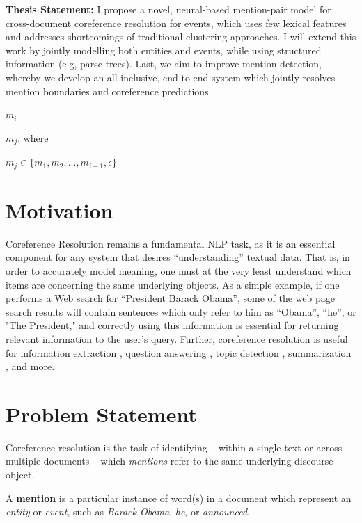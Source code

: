 \textbf{Thesis Statement:} I propose a novel, neural-based mention-pair model for cross-document coreference resolution for events, which uses few lexical features and addresses shortcomings of traditional clustering approaches.  I will extend this work by jointly modelling both entities and events, while using structured information (e.g, parse trees).  Last, we aim to improve mention detection, whereby we develop an all-inclusive, end-to-end system which jointly resolves mention boundaries and coreference predictions.

\vspace{10mm}

$m_{i}$  

$m_{j}$, where 

$m_{j} \in \{m_{1}, m_{2}, ..., m_{i-1}, \epsilon\}$ 




\section{Motivation}
Coreference Resolution remains a fundamental NLP task, as it is an essential component for any system that desires ``understanding'' textual data.  That is, in order to accurately model meaning, one must at the very least understand which items are concerning the same underlying objects.  As a simple example, if one performs a Web search for ``President Barack Obama'', some of the web page search results will contain sentences which only refer to him as ``Obama'', ``he'', or "The President," and correctly using this information is essential for returning relevant information to the user's query.  Further, coreference resolution is useful for information extraction \cite{Humphreys:1997:ECI:1598819.1598830}, question answering \cite{Narayanan:2004:QAB:1220355.1220455}, topic detection \cite{Allan:1998}, summarization \cite{Daniel:2003}, and more.

\section{Problem Statement}
Coreference resolution is the task of identifying -- within a single text or across multiple documents -- which \textit{mentions} refer to the same underlying discourse object. 

A \textbf{mention} is a particular instance of word(s) in a document which represent an \textit{entity} or \textit{event}, such as \textit{Barack Obama}, \textit{he}, or \textit{announced}.

